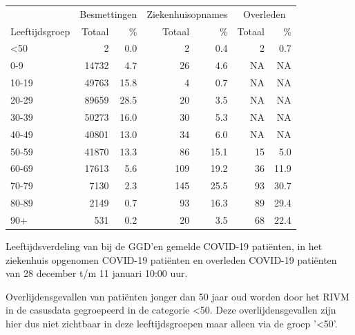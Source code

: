 \documentclass[
  english,
  man,floatsintext]{apa6}
\begin{document}
\begin{table}
\centering\begingroup\fontsize{11}{13}\selectfont

\begin{threeparttable}
\begin{tabular}{lrrrrrr}
\toprule
\multicolumn{1}{c}{ } & \multicolumn{2}{c}{Besmettingen} & \multicolumn{2}{c}{Ziekenhuisopnames} & \multicolumn{2}{c}{Overleden} \\
\cmidrule(l{3pt}r{3pt}){2-3} \cmidrule(l{3pt}r{3pt}){4-5} \cmidrule(l{3pt}r{3pt}){6-7}
Leeftijdsgroep & Totaal & \% & Totaal & \% & Totaal & \%\\
\midrule
<50 & 2 & 0.0 & 2 & 0.4 & 2 & 0.7\\
0-9 & 14732 & 4.7 & 26 & 4.6 & NA & NA\\
10-19 & 49763 & 15.8 & 4 & 0.7 & NA & NA\\
20-29 & 89659 & 28.5 & 20 & 3.5 & NA & NA\\
30-39 & 50273 & 16.0 & 30 & 5.3 & NA & NA\\
40-49 & 40801 & 13.0 & 34 & 6.0 & NA & NA\\
50-59 & 41870 & 13.3 & 86 & 15.1 & 15 & 5.0\\
60-69 & 17613 & 5.6 & 109 & 19.2 & 36 & 11.9\\
70-79 & 7130 & 2.3 & 145 & 25.5 & 93 & 30.7\\
80-89 & 2149 & 0.7 & 93 & 16.3 & 89 & 29.4\\
90+ & 531 & 0.2 & 20 & 3.5 & 68 & 22.4\\
\bottomrule
\end{tabular}
\begin{tablenotes}
\item[1] Leeftijdsverdeling van bij de GGD’en gemelde COVID-19 patiënten, in het ziekenhuis opgenomen COVID-19 patiënten en overleden COVID-19 patiënten van 28 december t/m 11 januari 10:00 uur.
\item[2] Overlijdensgevallen van patiënten jonger dan 50 jaar oud worden door het RIVM in de casusdata gegroepeerd in de categorie <50. Deze overlijdensgevallen zijn hier dus niet zichtbaar in deze leeftijdsgroepen maar alleen via de groep '<50'.
\end{tablenotes}
\end{threeparttable}
\endgroup{}
\end{table}

\newpage
\end{document}
